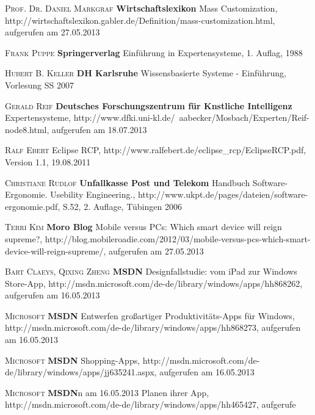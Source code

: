 \begin{thebibliography}{---}

           \textsc{Prof. Dr. Daniel Markgraf }
          \textbf{Wirtschaftslexikon}
          Mass Customization, http://wirtschaftslexikon.gabler.de/Definition/mass-customization.html, aufgerufen am 27.05.2013
          
 			 \textsc{Frank Puppe}
 			 \textbf{Springerverlag}
 			 Einführung in Expertensysteme, 1. Auflag, 1988
 			 
  			 \textsc{Hubert B. Keller}
  			 \textbf{DH Karlsruhe}
  			 Wissensbasierte Systeme - Einführung, Vorlesung SS 2007
  			 
             \textsc{Gerald Reif}
            \textbf{Deutsches Forschungszentrum für Knstliche Intelligenz}
            Expertensysteme, http://www.dfki.uni-kl.de/~aabecker/Mosbach/Experten/Reif-node8.html, aufgerufen am 18.07.2013
            
               \textsc{Ralf Ebert}
              Eclipse RCP, http://www.ralfebert.de/eclipse\_rcp/EclipseRCP.pdf, Version 1.1, 19.08.2011
  			
 			
           \textsc{Christiane Rudlof}
          \textbf{Unfallkasse Post und Telekom}
          Handbuch Software-Ergonomie. Usebility Engineering., http://www.ukpt.de/pages/dateien/software-ergonomie.pdf, S.52, 2. Auflage, Tübingen 2006

           \textsc{Terri Kim}
          \textbf{Moro Blog}
          Mobile versus PCs: Which smart device will reign supreme?, http://blog.mobileroadie.com/2012/03/mobile-versus-pcs-which-smart-device-will-reign-supreme/, aufgerufen am 27.05.2013

           \textsc{Bart Claeys, Qixing Zheng}
          \textbf{MSDN}
          Designfallstudie: vom iPad zur Windows Store-App, http://msdn.microsoft.com/de-de/library/windows/apps/hh868262, aufgerufen am 16.05.2013
          
            \textsc{Microsoft}
           \textbf{MSDN}
           Entwerfen großartiger Produktivitäts-Apps für Windows, http://msdn.microsoft.com/de-de/library/windows/apps/hh868273, aufgerufen am 16.05.2013
           
              \textsc{Microsoft}
             \textbf{MSDN}
             Shopping-Apps, http://msdn.microsoft.com/de-de/library/windows/apps/jj635241.aspx, aufgerufen am 16.05.2013
             
                \textsc{Microsoft}
               \textbf{MSDN}n am 16.05.2013
 Planen ihrer App, http://msdn.microsoft.com/de-de/library/windows/apps/hh465427, aufgerufe

 
\end{thebibliography}

